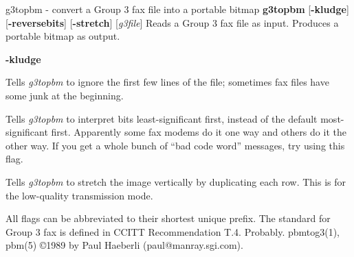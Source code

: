 g3topbm - convert a Group 3 fax file into a portable bitmap
{\bf g3topbm}
{\rm [}{\bf -kludge}{\rm ]}
{\rm [}{\bf -reversebits}{\rm ]}
{\rm [}{\bf -stretch}{\rm ]}
{\rm [}{\it g3file}{\rm ]}
Reads a Group 3 fax file as input.
Produces a portable bitmap as output.
\begin{TPlist}{{\bf -kludge}}
\item[{{\bf -kludge}}]
Tells
{\it g3topbm}
to ignore the first few lines of the file;
sometimes fax files have some junk at the beginning.
\item[{{\bf -reversebits}}]
Tells
{\it g3topbm}
to interpret bits least-significant
first, instead of the default most-significant first.
Apparently some fax modems do it one way and others do it the other way.
If you get a whole bunch of ``bad code word'' messages, try using this
flag.
\item[{{\bf -stretch}}]
Tells
{\it g3topbm}
to stretch the image vertically by
duplicating each row.
This is for the low-quality transmission mode.
\end{TPlist}

\par
All flags can be abbreviated to their shortest unique prefix.
The standard for Group 3 fax is defined in CCITT Recommendation T.4.
Probably.
pbmtog3(1), pbm(5)
\copyright 1989 by Paul Haeberli (paul@manray.sgi.com).
%
 
%

\newpage
%

